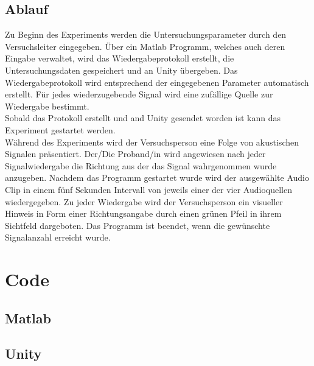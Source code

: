\subsection{Ablauf}
Zu Beginn des Experiments werden die Untersuchungsparameter durch den Versuchsleiter eingegeben. Über ein Matlab Programm, welches auch deren Eingabe verwaltet, wird das Wiedergabeprotokoll erstellt, die Untersuchungsdaten gespeichert und an Unity übergeben.
Das Wiedergabeprotokoll wird entsprechend der eingegebenen Parameter automatisch erstellt.
Für jedes wiederzugebende Signal wird eine zufällige Quelle zur Wiedergabe bestimmt.\\
Sobald das Protokoll erstellt und and Unity gesendet worden ist kann das Experiment gestartet werden.\\
Während des Experiments wird der Versuchsperson eine Folge von akustischen Signalen präsentiert. Der/Die Proband/in wird angewiesen nach jeder Signalwiedergabe die Richtung aus der das Signal wahrgenommen wurde anzugeben. Nachdem das Programm gestartet wurde
wird der ausgewählte Audio Clip in einem fünf Sekunden Intervall von jeweils einer der vier Audioquellen wiedergegeben. Zu jeder Wiedergabe wird der Versuchsperson ein visueller Hinweis in Form einer Richtungsangabe durch einen grünen Pfeil in ihrem Sichtfeld dargeboten. Das Programm ist beendet, wenn die gewünschte Signalanzahl erreicht wurde.

\newpage
\section{Code}
\subsection{Matlab}



\newpage
\subsection{Unity}




\newpage



